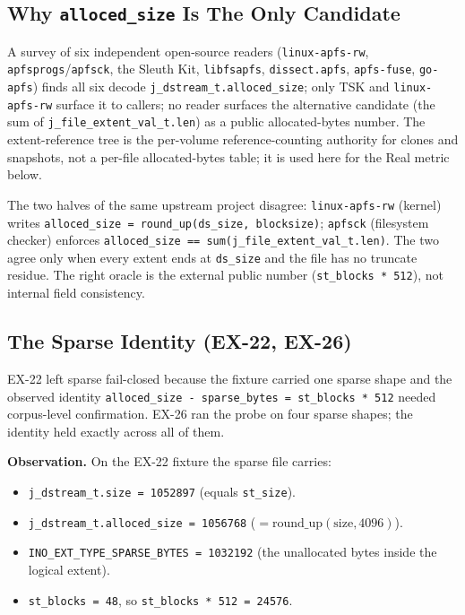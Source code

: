 \subsection{Why \texttt{alloced\_size} Is The Only Candidate}

A survey of six independent open-source readers
(\texttt{linux-apfs-rw}, \texttt{apfsprogs}/\texttt{apfsck},
the Sleuth Kit, \texttt{libfsapfs}, \texttt{dissect.apfs},
\texttt{apfs-fuse}, \texttt{go-apfs}) finds all six decode
\texttt{j\_dstream\_t.alloced\_size}; only TSK and
\texttt{linux-apfs-rw} surface it to callers; no reader surfaces
the alternative candidate (the sum of
\texttt{j\_file\_extent\_val\_t.len}) as a public allocated-bytes
number. The extent-reference tree is the per-volume
reference-counting authority for clones and snapshots, not a
per-file allocated-bytes table; it is used here for the Real metric
below.

The two halves of the same upstream project disagree:
\texttt{linux-apfs-rw} (kernel) writes
\texttt{alloced\_size = round\_up(ds\_size, blocksize)};
\texttt{apfsck} (filesystem checker) enforces
\texttt{alloced\_size == sum(j\_file\_extent\_val\_t.len)}. The two
agree only when every extent ends at \texttt{ds\_size} and the file
has no truncate residue. The right oracle is the external public
number (\texttt{st\_blocks * 512}), not internal field consistency.

\subsection{The Sparse Identity (EX-22, EX-26)}
\label{ssec:sparse-bytes-lift}

EX-22 left sparse fail-closed because the fixture carried one
sparse shape and the observed identity
\texttt{alloced\_size - sparse\_bytes = st\_blocks * 512} needed
corpus-level confirmation. EX-26 ran the probe on four sparse
shapes; the identity held exactly across all of them.

\textbf{Observation.} On the EX-22 fixture the sparse file carries:

\begin{itemize}
  \item \texttt{j\_dstream\_t.size = 1052897} (equals \texttt{st\_size}).
  \item \texttt{j\_dstream\_t.alloced\_size = 1056768}
    ($= \text{round\_up}(\text{size}, 4096)$).
  \item \texttt{INO\_EXT\_TYPE\_SPARSE\_BYTES = 1032192}
    (the unallocated bytes inside the logical extent).
  \item \texttt{st\_blocks = 48}, so
    \texttt{st\_blocks * 512 = 24576}.
\end{itemize}

